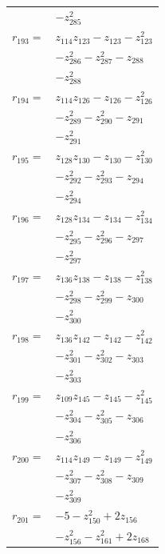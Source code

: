 \begin{longtable}{@{}r@{\;}l@{}}
 & \(\displaystyle -z_{285}^{2}\) \\[3pt]
\(r_{193}=\) & \(\displaystyle z_{114}z_{123} -z_{123} -z_{123}^{2}\) \\
 & \(\displaystyle -z_{286}^{2} -z_{287}^{2} -z_{288}\) \\
 & \(\displaystyle -z_{288}^{2}\) \\[3pt]
\(r_{194}=\) & \(\displaystyle z_{114}z_{126} -z_{126} -z_{126}^{2}\) \\
 & \(\displaystyle -z_{289}^{2} -z_{290}^{2} -z_{291}\) \\
 & \(\displaystyle -z_{291}^{2}\) \\[3pt]
\(r_{195}=\) & \(\displaystyle z_{128}z_{130} -z_{130} -z_{130}^{2}\) \\
 & \(\displaystyle -z_{292}^{2} -z_{293}^{2} -z_{294}\) \\
 & \(\displaystyle -z_{294}^{2}\) \\[3pt]
\(r_{196}=\) & \(\displaystyle z_{128}z_{134} -z_{134} -z_{134}^{2}\) \\
 & \(\displaystyle -z_{295}^{2} -z_{296}^{2} -z_{297}\) \\
 & \(\displaystyle -z_{297}^{2}\) \\[3pt]
\(r_{197}=\) & \(\displaystyle z_{136}z_{138} -z_{138} -z_{138}^{2}\) \\
 & \(\displaystyle -z_{298}^{2} -z_{299}^{2} -z_{300}\) \\
 & \(\displaystyle -z_{300}^{2}\) \\[3pt]
\(r_{198}=\) & \(\displaystyle z_{136}z_{142} -z_{142} -z_{142}^{2}\) \\
 & \(\displaystyle -z_{301}^{2} -z_{302}^{2} -z_{303}\) \\
 & \(\displaystyle -z_{303}^{2}\) \\[3pt]
\(r_{199}=\) & \(\displaystyle z_{109}z_{145} -z_{145} -z_{145}^{2}\) \\
 & \(\displaystyle -z_{304}^{2} -z_{305}^{2} -z_{306}\) \\
 & \(\displaystyle -z_{306}^{2}\) \\[3pt]
\(r_{200}=\) & \(\displaystyle z_{114}z_{149} -z_{149} -z_{149}^{2}\) \\
 & \(\displaystyle -z_{307}^{2} -z_{308}^{2} -z_{309}\) \\
 & \(\displaystyle -z_{309}^{2}\) \\[3pt]
\(r_{201}=\) & \(\displaystyle -5 -z_{150}^{2} +2z_{156}\) \\
 & \(\displaystyle -z_{156}^{2} -z_{161}^{2} +2z_{168}\) \\

\end{longtable}
